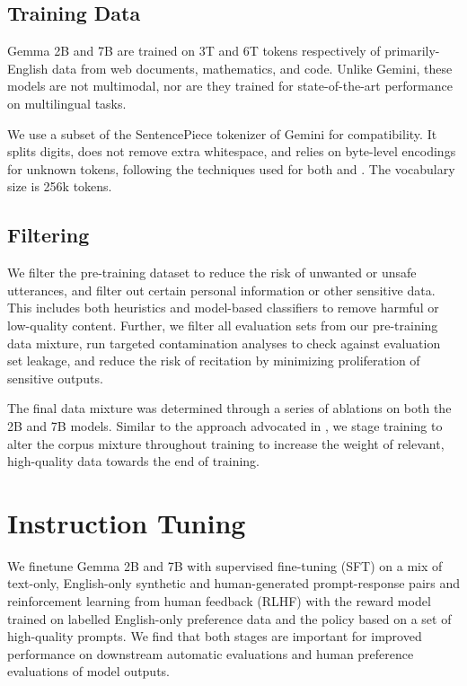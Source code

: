 \documentclass[11pt, a4paper, logo, twocolumn, copyright, nonumbering]{googledeepmind}
\begin{document}
\subsection{Training Data}
Gemma 2B and 7B are trained on 3T and 6T tokens respectively of primarily-English data from web documents, mathematics, and code. Unlike Gemini, these models are not multimodal, nor are they trained for state-of-the-art performance on multilingual tasks.

We use a subset of the SentencePiece tokenizer \citep{kudo-richardson-2018-sentencepiece} of Gemini for compatibility.  It splits digits, does not remove extra whitespace, and relies on byte-level encodings for unknown tokens, following the techniques used for both \citep{chowdhery2022palm} and \citep{geminiteam2023gemini}. The vocabulary size is 256k tokens.

\subsection{Filtering}

We filter the pre-training dataset to reduce the risk of unwanted or unsafe utterances, and filter out certain personal information or other sensitive data. This includes both heuristics and model-based classifiers to remove harmful or low-quality content. Further, we filter all evaluation sets from our pre-training data mixture, run targeted contamination analyses to check against evaluation set leakage, and reduce the risk of recitation by minimizing proliferation of sensitive outputs. 

The final data mixture was determined through a series of ablations on both the 2B and 7B models. Similar to the approach advocated in \citep{geminiteam2023gemini}, we stage training to alter the corpus mixture throughout training to increase the weight of relevant, high-quality data towards the end of training.

\section{Instruction Tuning}

We finetune Gemma 2B and 7B with supervised fine-tuning (SFT) on a mix of text-only, English-only synthetic and human-generated prompt-response pairs and reinforcement learning from human feedback (RLHF) with the reward model trained on labelled English-only preference data and the policy based on a set of high-quality prompts. We find that both stages are important for improved performance on downstream automatic evaluations and human preference evaluations of model outputs.
\end{document}
